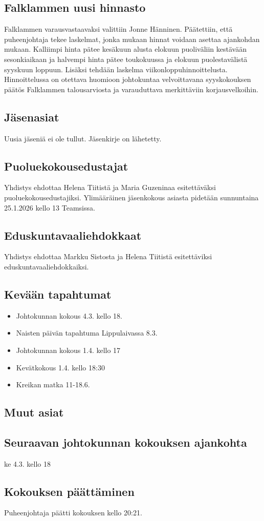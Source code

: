 \documentclass[a4paper,12pt]{article}
\begin{document}
\subsection{Falklammen uusi hinnasto}
Falklammen varausvastaavaksi valittiin Jonne Hänninen. Päätettiin, että puheenjohtaja tekee laskelmat, jonka mukaan hinnat voidaan asettaa ajankohdan mukaan. Kalliimpi hinta pätee kesäkuun alusta elokuun puoliväliin kestävään sesonkiaikaan ja halvempi hinta pätee toukokuussa ja elokuun puolestavälistä syyskuun loppuun. Lisäksi tehdään laskelma viikonloppuhinnoittelusta. Hinnoittelussa on otettava huomioon johtokuntaa velvoittavana syyskokouksen päätös Falklammen talousarviosta ja varauduttava merkittäviin korjausvelkoihin.
\subsection{Jäsenasiat}
Uusia jäseniä ei ole tullut. Jäsenkirje on lähetetty.
\subsection{Puoluekokousedustajat}
Yhdistys ehdottaa Helena Tiitistä ja Maria Guzeninaa esitettäväksi puoluekokousedustajiksi. Ylimääräinen jäsenkokous asiasta pidetään sunnuntaina 25.1.2026 kello 13 Teamsissa.
\subsection{Eduskuntavaaliehdokkaat}
Yhdistys ehdottaa Markku Sistosta ja Helena Tiitistä esitettäviksi eduskuntavaaliehdokkaiksi.
\subsection{Kevään tapahtumat}
\begin{itemize}
\item{Johtokunnan kokous} 4.3. kello 18.
\item{Naisten päivän tapahtuma Lippulaivassa} 8.3.
\item{Johtokunnan kokous} 1.4. kello 17
\item{Kevätkokous} 1.4. kello 18:30
\item{Kreikan matka} 11-18.6.
\end{itemize}
\subsection{Muut asiat}
\subsection{Seuraavan johtokunnan kokouksen ajankohta}
ke 4.3. kello 18
\subsection{Kokouksen päättäminen}
Puheenjohtaja päätti kokouksen kello 20:21.
\end{document}
